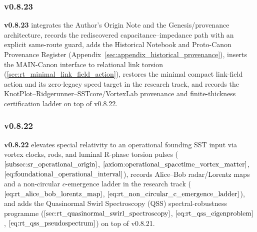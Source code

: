 \documentclass[11pt]{article}
\theoremstyle{definition}
\theoremstyle{plain}
\theoremstyle{remark}
\begin{document}
        \subsubsection{v0.8.23}
            \textbf{v0.8.23} integrates the Author's Origin Note and the Genesis/provenance architecture, records the rediscovered capacitance--impedance path with an explicit same-route guard, adds the Historical Notebook and Proto-Canon Provenance Register (Appendix~\ref{sec:appendix_historical_provenance}), inserts the MAIN-Canon interface to relational link torsion (\ref{sec:rt_minimal_link_field_action}), restores the minimal compact link-field action and its zero-legacy speed target in the research track, and records the KnotPlot--Ridgerunner--SSTcore/VortexLab provenance and finite-thickness certification ladder on top of v0.8.22.

        \subsubsection{v0.8.22}
            \textbf{v0.8.22} elevates special relativity to an operational founding SST input via vortex clocks, rods, and luminal R-phase torsion pulses (\(\ref{subsec:sr_operational_origin}\), \(\ref{axiom:operational_spacetime_vortex_matter}\), \(\ref{eq:foundational_operational_interval}\)), records Alice--Bob radar/Lorentz maps and a non-circular \(c\)-emergence ladder in the research track (\(\ref{eq:rt_alice_bob_lorentz_map}\), \(\ref{eq:rt_non_circular_c_emergence_ladder}\)), and adds the Quasinormal Swirl Spectroscopy (QSS) spectral-robustness programme (\(\ref{sec:rt_quasinormal_swirl_spectroscopy}\), \(\ref{eq:rt_qss_eigenproblem}\), \(\ref{eq:rt_qss_pseudospectrum}\)) on top of v0.8.21.
\end{document}
